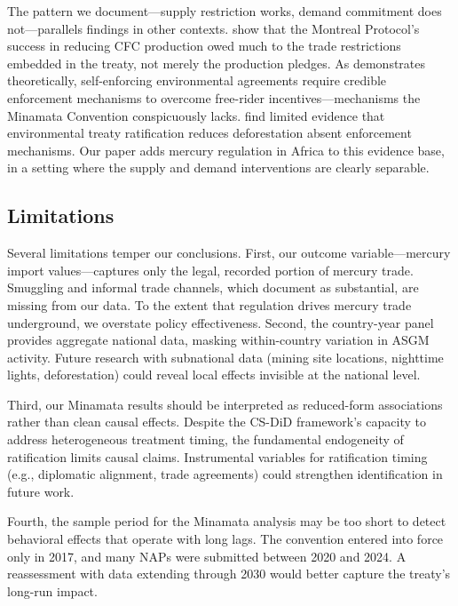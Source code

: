 \documentclass[12pt]{article}
\begin{document}
The pattern we document---supply restriction works, demand commitment does not---parallels findings in other contexts. \citet{murdoch2003international} show that the Montreal Protocol's success in reducing CFC production owed much to the trade restrictions embedded in the treaty, not merely the production pledges. As \citet{barrett1994self} demonstrates theoretically, self-enforcing environmental agreements require credible enforcement mechanisms to overcome free-rider incentives---mechanisms the Minamata Convention conspicuously lacks. \citet{aisbett2010treaty} find limited evidence that environmental treaty ratification reduces deforestation absent enforcement mechanisms. Our paper adds mercury regulation in Africa to this evidence base, in a setting where the supply and demand interventions are clearly separable.

\subsection{Limitations}

Several limitations temper our conclusions. First, our outcome variable---mercury import values---captures only the legal, recorded portion of mercury trade. Smuggling and informal trade channels, which \citet{fritz2022smuggling} document as substantial, are missing from our data. To the extent that regulation drives mercury trade underground, we overstate policy effectiveness. Second, the country-year panel provides aggregate national data, masking within-country variation in ASGM activity. Future research with subnational data (mining site locations, nighttime lights, deforestation) could reveal local effects invisible at the national level.

Third, our Minamata results should be interpreted as reduced-form associations rather than clean causal effects. Despite the CS-DiD framework's capacity to address heterogeneous treatment timing, the fundamental endogeneity of ratification limits causal claims. Instrumental variables for ratification timing (e.g., diplomatic alignment, trade agreements) could strengthen identification in future work.

Fourth, the sample period for the Minamata analysis may be too short to detect behavioral effects that operate with long lags. The convention entered into force only in 2017, and many NAPs were submitted between 2020 and 2024. A reassessment with data extending through 2030 would better capture the treaty's long-run impact.
\end{document}
